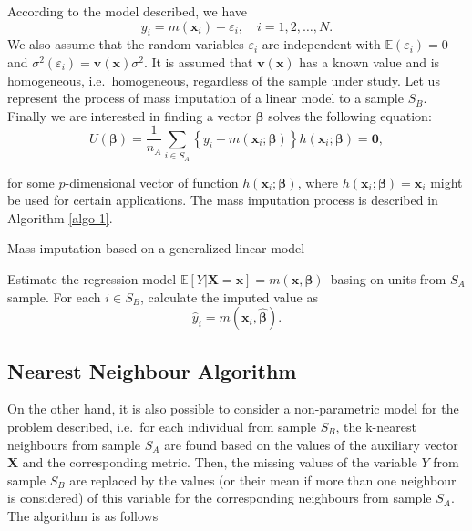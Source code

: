 \documentclass[
]{jss}
\begin{document}
According to the model described, we have \[
y_i=m\left(\boldsymbol{x}_i\right)+\varepsilon_i, \quad i=1,2, \ldots, N.
\] We also assume that the random variables \(\varepsilon_i\) are
independent with \(\mathbb{E} \left(\varepsilon_i \right) = 0\) and
\(\sigma^2 \left(\varepsilon_i \right) = \mathbf{v} \left(\boldsymbol{x}\right) \sigma^2\).
It is assumed that \(\mathbf{v} \left(\boldsymbol{x}\right)\) has a
known value and is homogeneous, i.e.~homogeneous, regardless of the
sample under study. Let us represent the process of mass imputation of a
linear model to a sample \(S_B\). Finally we are interested in finding a
vector \(\boldsymbol{\beta}\) solves the following equation:
\begin{equation}
\label{eq-2.3}
U(\boldsymbol{\beta})=\frac{1}{n_A} \sum_{i \in S_A}\left\{y_i-m\left(\boldsymbol{x}_i ; \boldsymbol{\beta}\right)\right\} h\left(\boldsymbol{x}_i ; \boldsymbol{\beta}\right)=\mathbf{0},
\end{equation}

for some \(p\)-dimensional vector of function
\(h\left(\boldsymbol{x}_i ; \boldsymbol{\beta}\right)\), where
\(h\left(\boldsymbol{x}_i ; \boldsymbol{\beta}\right) = \boldsymbol{x}_i\)
might be used for certain applications. The mass imputation process is
described in Algorithm \ref{algo-1}.

\begin{algorithm}[H]
\caption{Mass imputation based on a generalized linear model}
\label{algo-1}
\begin{algorithmic}[1]
 \State Estimate the regression model $\mathbb{E}[Y|\boldsymbol{X}=\boldsymbol{x}]=m(\boldsymbol{x}, \boldsymbol{\beta})$\ basing on units from $S_A$ sample.
 \State For each $i \in S_B$, calculate the imputed value as
 $$
 \hat{y}_i = m\left(\boldsymbol{x}_{i},\hat{\boldsymbol{\beta}}\right).
 $$
\end{algorithmic}
\end{algorithm}

\subsection{Nearest Neighbour
Algorithm}\label{nearest-neighbour-algorithm}

On the other hand, it is also possible to consider a non-parametric
model for the problem described, i.e.~for each individual from sample
\(S_B\), the k-nearest neighbours from sample \(S_A\) are found based on
the values of the auxiliary vector \(\boldsymbol{X}\) and the
corresponding metric. Then, the missing values of the variable \(Y\)
from sample \(S_B\) are replaced by the values (or their mean if more
than one neighbour is considered) of this variable for the corresponding
neighbours from sample \(S_A\). The algorithm is as follows
\end{document}
